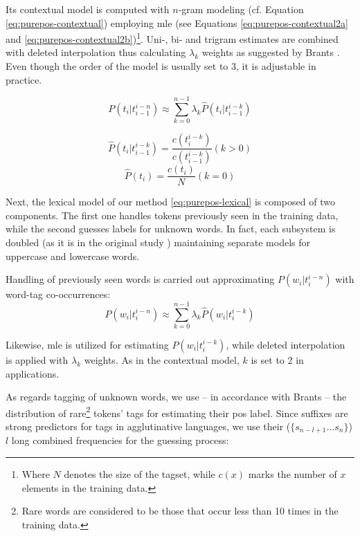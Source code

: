 Its contextual model is computed with $n$-gram modeling (cf. Equation \ref{eq:purepos-contextual}) employing \gls{mle} (see Equations \ref{eq:purepos-contextual2a} and \ref{eq:purepos-contextual2b})\footnote{Where $N$ denotes the size of the tagset, while $c(x)$ marks the number of $x$ elements in the training data.}. 
Uni-, bi- and trigram estimates are combined with deleted interpolation thus calculating $\lambda_k$ weights as suggested by Brants \cite{Brants2000}. Even though the order of the model is usually set to 3, it is adjustable in practice. 


\begin{equation}\label{eq:purepos-contextual}
P(t_i | t_{i-1}^{i-n}) \approx \sum_{k=0}^{n-1} \lambda_k \hat{P}(t_i|t_{i-1}^{i-k})
\end{equation}

\begin{equation}\label{eq:purepos-contextual2a}
\hat{P}(t_i|t_{i-1}^{i-k}) = \frac{c(t^{i-k}_i)}{c(t_{i-1}^{i-k})} (k>0) 
\end{equation}
\begin{equation}\label{eq:purepos-contextual2b}
\hat{P}(t_i) = \frac{c(t_i)}{N} (k=0)
\end{equation}

Next, the lexical model of our method \eqref{eq:purepos-lexical} is composed of two components. 
The first one handles tokens previously seen in the training data, while the second guesses labels for unknown words. 
In fact, each subsystem is doubled (as it is in the original study \cite{Brants2000}) maintaining separate models for uppercase and lowercase words. 

Handling of previously seen words is carried out approximating $P(w_i | t_{i}^{i-n})$ with word-tag co-occurrences: 
\begin{equation} \label{eq:purepos-lexical}
P(w_i | t_{i}^{i-n}) \approx  \sum_{k=0}^{n-1} \lambda_k \hat{P}(w_i|t_{i}^{i-k})
\end{equation}

\label{sec:purepos-guesser}
Likewise, \gls{mle} is utilized for estimating $P(w_i|t_{i}^{i-k})$, while deleted interpolation is applied with $\lambda_k$ weights. 
As in the contextual model, $k$ is set to 2 in applications.

As regards tagging of unknown words, we use -- in accordance with Brants -- the distribution of rare\footnote{Rare words are considered to be those that occur less than 10 times in the training data.}
tokens’ tags for estimating their \gls{pos} label. Since suffixes are strong predictors for tags in agglutinative languages, we use their ($\{s_{n-l+1} \dots s_n\}$) $l$ long combined frequencies for the guessing process:

